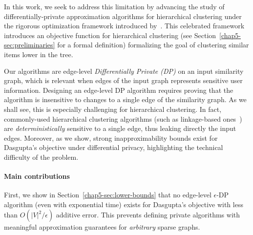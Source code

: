 In this work, we seek to address this limitation by advancing the study of differentially-private approximation algorithms for hierarchical clustering under the rigorous optimization framework introduced by~\citet{dasgupta2016cost}. This celebrated framework introduces an objective function for hierarchical clustering (see Section~\ref{chap5-sec:preliminaries} for a formal definition) formalizing the goal of clustering similar items lower in the tree. 



Our algorithms are edge-level {\em Differentially Private (DP)} on an input similarity graph, which is relevant when edges of the input graph represents sensitive user information.
Designing an edge-level DP algorithm requires proving that the algorithm is insensitive to changes to a single edge of the similarity graph. As we shall see, this is especially challenging for hierarchical clustering. In fact, commonly-used hierarchical clustering algorithms (such as linkage-based ones~\citep{J10}) are {\it deterministically} sensitive to a single edge, thus leaking directly the input edges. Moreover, as we show, strong inapproximability bounds exist for Dasgupta's objective under differential privacy, highlighting the technical difficulty of the problem.

\paragraph{Main contributions}
First, we show in Section~\ref{chap5-sec:lower-bounds} that no edge-level $\epsilon$-DP algorithm (even with exponential time) exists for Dasgupta's objective with less than $O(|V|^2/ \epsilon)$ additive error. This prevents defining private algorithms with meaningful approximation guarantees for {\it arbitrary} sparse graphs.

